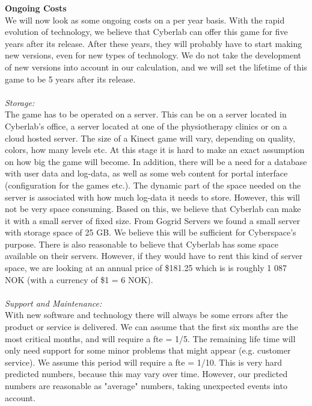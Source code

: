 \newpage
\textbf{Ongoing Costs}\\
We will now look as some ongoing costs on a per year basis. With the rapid evolution of technology, we believe that Cyberlab can offer this game for five years after its release. After these years, they will probably have to start making new versions, even for new types of technology. We do not take the development of new versions into account in our calculation, and we will set the lifetime of this game to be 5 years after its release.\\ \\
\emph{Storage:}\\
The game has to be operated on a server. This can be on a server located in Cyberlab’s office, a server located at one of the physiotherapy clinics or on a cloud hosted server. The size of a Kinect game will vary, depending on quality, colors, how many levels etc. At this stage it is hard to make an exact assumption on how big the game will become. In addition, there will be a need for a database with user data and log-data, as well as some web content for portal interface (configuration for the games etc.). The dynamic part of the space needed on the server is associated with how much log-data it needs to store. However, this will not be very space consuming. Based on this, we believe that Cyberlab can make it with a small server of fixed size. From Gogrid Servers \cite{priceserver} we found a small server with storage space of 25 GB. We believe this will be sufficient for Cyberspace's purpose. There is also reasonable to believe that Cyberlab has some space available on their servers. However, if they would have to rent this kind of server space, we are looking at an annual price of \$181.25 which is is roughly 1 087 NOK (with a currency of \$1 = 6 NOK).\\ \\
\emph{Support and Maintenance:}\\
With new software and technology there will always be some errors after the product or service is delivered. We can assume that the first six months are the most critical months, and will require a \ac{fte} = 1/5. The remaining life time will only need support for some minor problems that might appear (e.g. customer service). We assume this period will require a \ac{fte} = 1/10. This is very hard predicted numbers, because this may vary over time. However, our predicted numbers are reasonable as "average" numbers, taking unexpected events into account.  \\ \\
